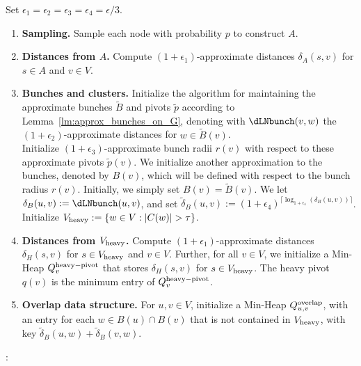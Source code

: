 Set $\epsilon_1=\epsilon_2=\epsilon_3=\epsilon_4=\epsilon/3$.
\begin{enumerate}
    \item \textbf{Sampling.} Sample each node with probability $p$ to construct $A$. \label{step:sampling_moved}
    \item \textbf{Distances from $A$.} Compute $(1+\epsilon_1)$-approximate distances $\delta_A(s,v)$ for $s\in A$ and $v\in V$. 
    \item \textbf{Bunches and clusters.} Initialize the algorithm for maintaining the approximate bunches $\tilde B$ and pivots $\tilde p$ according to Lemma~\ref{lm:approx_bunches_on_G}, denoting with $\dLNbunch(v,w)$ the $(1+\epsilon_2)$-approximate distances for $w\in \tilde B(v)$.\\
    Initialize $(1+\epsilon_3)$-approximate bunch radii $r(v)$ with respect to these approximate pivots $\tilde p(v)$.  \label{step:A_MSSP_moved}
    We initialize another approximation to the bunches, denoted by $B(v)$, which will be defined with respect to the bunch radius $r(v)$. Initially, we simply set $B(v)=\tilde{B}(v)$. We let $\delta_B(u,v):=\dLNbunch(u,v)$, and set $\tilde \delta_B(u,v) := (1+\epsilon_4)^{\lceil \log_{1+\epsilon_4}(\delta_B(u,v))\rceil}$. Initialize $V_{\rm{heavy}}:= \{w\in V : |C(w)|>\tau\}$. \label{step:bunches_moved}
    \item \textbf{Distances from $V_{\rm{heavy}}$.} Compute $(1+\epsilon_1)$-approximate distances $\delta_H(s,v)$ for $s\in V_{\rm{heavy}}$ and $v\in V$. Further, for all $v\in V$, we initialize a Min-Heap $Q^{\rm{heavy-pivot}}_v$ that stores $\delta_H(s,v)$ for $s\in V_{\rm{heavy}}$. The heavy pivot $q(v)$ is the minimum entry of $Q^{\rm{heavy-pivot}}_v$. \label{step:H_MSSP_moved}
    \item \textbf{Overlap data structure.} For $u,v\in V$, initialize a Min-Heap $Q^{\rm{overlap}}_{u,v}$, with an entry for each $w\in B(u)\cap B(v)$ that is not contained in $V_{\rm{heavy}}$, with key $\tilde \delta_B(u,w)+\tilde \delta_B(v,w)$.
\end{enumerate}

\noindent{}:\\
\indent {}\\

